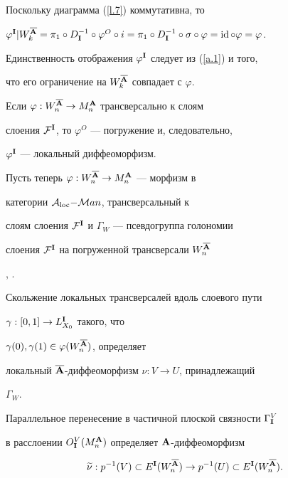 \begin{pf}
Поскольку диаграмма (\ref{l.7}) коммутативна, то


$\varphi^\I|W^{\overline\A}_k=\pi_1\circ D^{-1}_\I\circ


\varphi^O\circ i=\pi_1\circ D^{-1}_\I\circ\sigma\circ\varphi=


\id\circ\varphi=\varphi$.


Единственность отображения $\varphi^{\bold I}$ следует из (\ref{a.1}) и того,


что его ограничение на $W^{\overline{{\bold A}}}_k$ совпадает с $\varphi$.


 


Если $\varphi: W^{\overline{{\bold A}}}_n\to M^{\bold A}_n$ трансверсально к слоям


слоения ${\cal F}^{\bold I}$, то $\varphi^O$ --- погружение и, следовательно,


$\varphi^{\bold I}$ --- локальный диффеоморфизм.


\end{pf}





 


Пусть теперь $\varphi: W^{\overline{{\bold A}}}_n\to M^{\bold A}_n$ --- морфизм в


категории ${\cal A}_{\operatorname{loc}}{-}{\cal M}an$, трансверсальный к


слоям слоения ${\cal F}^{\bold I}$ и $\Gamma_W$ --- псевдогруппа голономии


слоения ${\cal F}^{\bold I}$ на погруженной трансверсали $W^{\overline{{\bold A}}}_n$


\cite{Mol}, \cite{Rein}.


Скольжение локальных трансверсалей вдоль слоевого пути


$\gamma:[0,1]\to L^{{\bold I}}_{X_0}$ такого, что


$\gamma(0),\gamma(1)\in\varphi(W^{\overline{{\bold A}}}_n)$, определяет


локальный $\overline{{\bold A}}$-диффеоморфизм $\nu:V\to U$, принадлежащий


$\Gamma_W$.


Параллельное перенесение в частичной плоской связности $\Gamma^V_{{\bold I}}$


в расслоении $O_{\bold I}^V(M^{\bold A}_n)$ определяет ${\bold A}$-диффеоморфизм


\begin{equation}


\widetilde\nu:p^{-1}(V)\subset E^\I(W^{\overline\A}_n)


\to p^{-1}(U)\subset E^\I(W^{\overline\A}_n).


\label{nu}


\end{equation}


